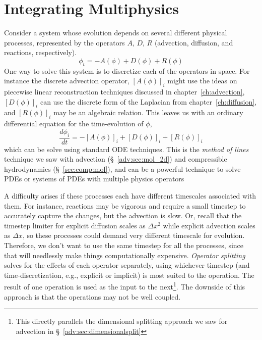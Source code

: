 
\section{Integrating Multiphysics}

Consider a system whose evolution depends on several different
physical processes, represented by the operators $A$, $D$,
$R$ (advection, diffusion, and reactions, respectively).
\begin{equation}
\phi_t = -A(\phi) + D(\phi) + R(\phi)
\end{equation}
One way to solve this system is to discretize each of the operators in
space.  For instance the discrete advection operator, $[A(\phi)]_i$
might use the ideas on piecewise linear reconstruction techniques
discussed in chapter~\ref{ch:advection}, $[D(\phi)]_i$ can use the
discrete form of the Laplacian from chapter~\ref{ch:diffusion}, and
$[R(\phi)]_i$ may be an algebraic relation.  This leaves us with an ordinary differential equation for the time-evolution of $\phi$,
\begin{equation}
\frac{d\phi_i}{dt} = -[A(\phi)]_i + [D(\phi)]_i + [R(\phi)]_i
\end{equation}
which can be solve using standard ODE techniques.  This is the {\em
  method of lines} technique we saw with advection
(\S~\ref{adv:sec:mol_2d}) and compressible hydrodynamics
(\S~\ref{sec:comp:mol}), and can be a powerful technique to solve PDEs
or systems of PDEs with multiple physics operators

A difficulty arises if these processes each have different timescales
associated with them.  For instance, reactions may be vigorous and
require a small timestep to accurately capture the changes, but the
advection is slow.  Or, recall that the timestep limiter for explicit
diffusion scales as $\Delta x^2$ while explicit advection scales as
$\Delta x$, so these processes could demand very different timescale
for evolution.  Therefore, we don't want to use the same timestep for
all the processes, since that will needlessly make things
computationally expensive.  {\em Operator splitting} solves for the
effects of each operator separately, using whichever timestep (and
time-discretization, e.g., explicit or implicit) is most suited to the
operation.  The result of one operation is used as the input to the
next\footnote{This directly parallels the dimensional splitting
  approach we saw for advection in \S~\ref{adv:sec:dimensionalsplit}}.
The downside of this approach is that the operations may not be well
coupled.


